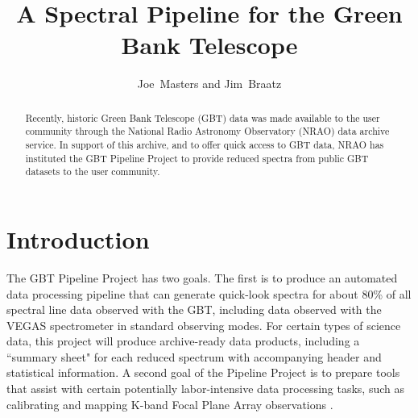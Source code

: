 
\resetcounters




\title{A Spectral Pipeline for the Green Bank Telescope}
\author{Joe~Masters and Jim~Braatz
}


\begin{abstract}
Recently, historic Green Bank Telescope (GBT) data was made available to the user community through the National Radio Astronomy Observatory (NRAO) data archive service.  In support of this archive, and to offer quick access to GBT data, NRAO has instituted the GBT Pipeline Project to provide reduced spectra from public GBT datasets to the user community.
\end{abstract}

\section{Introduction}

The GBT Pipeline Project has two goals. The first is to produce an automated data processing pipeline that can generate quick-look spectra for about 80\% of all spectral line data observed with the GBT, including data observed with the VEGAS spectrometer \citep{2012arXiv1202.0938A} in standard observing modes. For certain types of science data, this project will produce archive-ready data products, including a ``summary sheet" for each reduced spectrum with accompanying header and statistical information. A second goal of the Pipeline Project is to prepare tools that assist with certain potentially labor-intensive data processing tasks, such as calibrating and mapping K-band Focal Plane Array observations \citep[see][]{2011ASPC..442..127M}.

